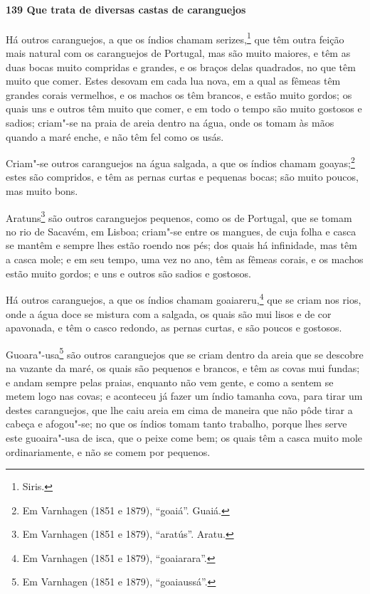 \begin{linenumbers}
\paragraph{139 Que trata de diversas castas de caranguejos}\quad
Há outros caranguejos, a que os índios chamam serizes,\footnote{ Siris.} que têm outra
feição mais natural com os caranguejos de Portugal, mas são muito maiores, e têm as duas
bocas muito compridas e grandes, e os braços delas quadrados, no que têm muito que comer.
Estes desovam em cada lua nova, em a qual as fêmeas têm grandes corais vermelhos, e os
machos os têm brancos, e estão muito gordos; os quais uns e outros têm muito que comer, e
em todo o tempo são muito gostosos e sadios; criam"-se na praia de areia dentro na água,
onde os tomam às mãos quando a maré enche, e não têm fel como os usás.

Criam"-se outros caranguejos na água salgada, a que os índios chamam goayas;\footnote{ Em
Varnhagen (1851 e 1879), ``goaiá''. Guaiá.} estes são compridos, e têm as pernas curtas e
pequenas bocas; são muito poucos, mas muito bons.

Aratuns\footnote{ Em Varnhagen (1851 e 1879), ``aratús''. Aratu.} são outros caranguejos
pequenos, como os de Portugal, que se tomam no rio de Sacavém, em Lisboa; criam"-se entre
os mangues, de cuja folha e casca se mantêm e sempre lhes estão roendo nos pés; dos quais
há infinidade, mas têm a casca mole; e em seu tempo, uma vez no ano, têm as fêmeas corais,
e os machos estão muito gordos; e uns e outros são sadios e gostosos.

Há outros caranguejos, a que os índios chamam goaiareru,\footnote{ Em Varnhagen (1851 e
1879), ``goaiarara''.} que se criam nos rios, onde a água doce se mistura com a salgada,
os quais são mui lisos e de cor apavonada, e têm o casco redondo, as pernas curtas, e são
poucos e gostosos.

Guoara"-usa\footnote{ Em Varnhagen (1851 e 1879), ``goaiaussá''.} são outros caranguejos
que se criam dentro da areia que se descobre na vazante da maré, os quais são pequenos e
brancos, e têm as covas mui fundas; e andam sempre pelas praias, enquanto não vem gente, e
como a sentem se metem logo nas covas; e aconteceu já fazer um índio tamanha cova, para
tirar um destes caranguejos, que lhe caiu areia em cima de maneira que não pôde tirar a
cabeça e afogou"-se; no que os índios tomam tanto trabalho, porque lhes serve este
guoaira"-usa de isca, que o peixe come bem; os quais têm a casca muito mole ordinariamente,
e não se comem por pequenos.


\end{linenumbers}
